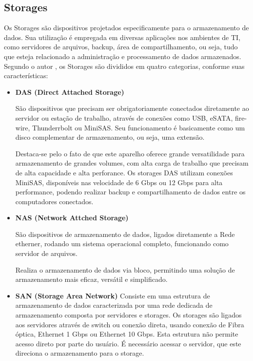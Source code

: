 \subsection{Storages}

Os Storages são dispositivos projetados especificamente para o armazenamento de dados. Sua utilização é empregada em diversas aplicações nos ambientes de TI, como servidores de arquivos, backup, área de compartilhamento, ou seja, tudo que esteja relacionado a administração e processamento de dados armazenados. Segundo o autor , os Storages são divididos em quatro categorias, conforme suas características:
\begin{itemize}
\item \textbf{DAS (Direct Attached Storage)}

São dispositivos que precisam ser obrigatoriamente conectados diretamente ao servidor ou estação de trabalho, através de conexões como USB, eSATA, fire-wire, Thunderrbolt ou MiniSAS. Seu funcionamento é basicamente como um disco complementar de armazenamento, ou seja, uma extensão.

Destaca-se pelo o fato de que este aparelho oferece grande versatilidade para armazenamento de grandes volumes, com alta carga de trabalho que precisam de alta capacidade e alta perforance. Os storages DAS utilizam conexões MiniSAS, disponíveis nas velocidade de 6 Gbps ou 12 Gbps para alta performance, podendo realizar backup e compartilhamento de dados entre os computadores conectados.

\item \textbf{NAS (Network Attched Storage)}

São dispositivos de armazenamento de dados, ligados diretamente a Rede etherner, rodando um sistema operacional completo, funcionando como servidor de arquivos.

Realiza o armazenamento de dados via bloco, permitindo uma solução de armazenamento mais eficaz, versátil e simplificado.

\item \textbf{SAN (Storage Area Network)}
Consiste em uma estrutura de armazenamento de dados caracterizada por uma rede dedicada de armazenamento composta por servidores e storages. Os storages são ligados aos servidores através de switch ou conexão direta, usando conexão de Fibra óptica, Ethernet 1 Gbps ou Ethernet 10 Gbps. Esta estrutura não permite acesso direto por parte do usuário. É necessário acessar o servidor, que este direciona o armazenamento para o storage.


\end{itemize}
